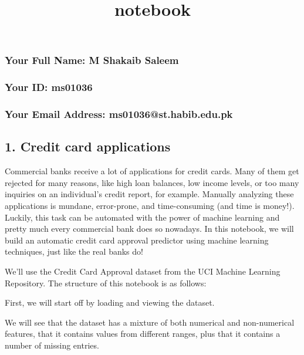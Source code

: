 \documentclass[11pt]{article}
\title{notebook}
\begin{document}
    
    
    \maketitle
    
    

    
    \hypertarget{your-full-name-m-shakaib-saleem}{%
\subsubsection{Your Full Name: M Shakaib
Saleem}\label{your-full-name-m-shakaib-saleem}}

\hypertarget{your-id-ms01036}{%
\subsubsection{Your ID: ms01036}\label{your-id-ms01036}}

\hypertarget{your-email-address-ms01036st.habib.edu.pk}{%
\subsubsection{Your Email Address:
ms01036@st.habib.edu.pk}\label{your-email-address-ms01036st.habib.edu.pk}}

    \hypertarget{credit-card-applications}{%
\subsection{1. Credit card
applications}\label{credit-card-applications}}

Commercial banks receive a lot of applications for credit cards. Many of
them get rejected for many reasons, like high loan balances, low income
levels, or too many inquiries on an individual's credit report, for
example. Manually analyzing these applications is mundane, error-prone,
and time-consuming (and time is money!). Luckily, this task can be
automated with the power of machine learning and pretty much every
commercial bank does so nowadays. In this notebook, we will build an
automatic credit card approval predictor using machine learning
techniques, just like the real banks do!

We'll use the Credit Card Approval dataset from the UCI Machine Learning
Repository. The structure of this notebook is as follows:

First, we will start off by loading and viewing the dataset.

We will see that the dataset has a mixture of both numerical and
non-numerical features, that it contains values from different ranges,
plus that it contains a number of missing entries.
\end{document}
